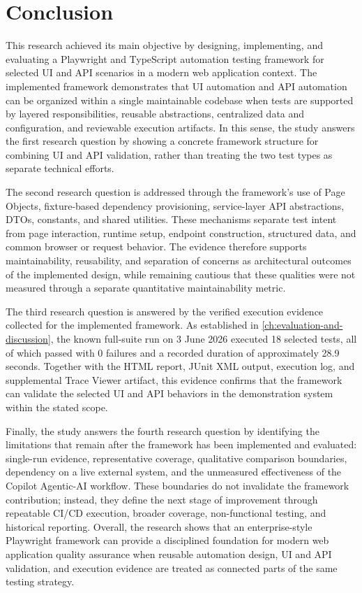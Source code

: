 \section{Conclusion}
\label{sec:ch6-conclusion}

This research achieved its main objective by designing, implementing, and evaluating a Playwright and TypeScript automation testing framework for selected UI and API scenarios in a modern web application context. The implemented framework demonstrates that UI automation and API automation can be organized within a single maintainable codebase when tests are supported by layered responsibilities, reusable abstractions, centralized data and configuration, and reviewable execution artifacts. In this sense, the study answers the first research question by showing a concrete framework structure for combining UI and API validation, rather than treating the two test types as separate technical efforts.

The second research question is addressed through the framework's use of Page Objects, fixture-based dependency provisioning, service-layer API abstractions, DTOs, constants, and shared utilities. These mechanisms separate test intent from page interaction, runtime setup, endpoint construction, structured data, and common browser or request behavior. The evidence therefore supports maintainability, reusability, and separation of concerns as architectural outcomes of the implemented design, while remaining cautious that these qualities were not measured through a separate quantitative maintainability metric.

The third research question is answered by the verified execution evidence collected for the implemented framework. As established in \cref{ch:evaluation-and-discussion}, the known full-suite run on 3 June 2026 executed 18 selected tests, all of which passed with 0 failures and a recorded duration of approximately 28.9 seconds. Together with the HTML report, JUnit XML output, execution log, and supplemental Trace Viewer artifact, this evidence confirms that the framework can validate the selected UI and API behaviors in the demonstration system within the stated scope.

Finally, the study answers the fourth research question by identifying the limitations that remain after the framework has been implemented and evaluated: single-run evidence, representative coverage, qualitative comparison boundaries, dependency on a live external system, and the unmeasured effectiveness of the Copilot Agentic-AI workflow. These boundaries do not invalidate the framework contribution; instead, they define the next stage of improvement through repeatable CI/CD execution, broader coverage, non-functional testing, and historical reporting. Overall, the research shows that an enterprise-style Playwright framework can provide a disciplined foundation for modern web application quality assurance when reusable automation design, UI and API validation, and execution evidence are treated as connected parts of the same testing strategy.

